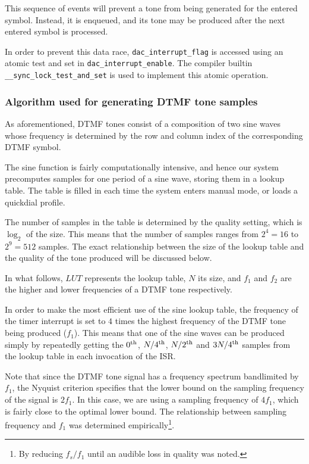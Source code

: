 \documentclass[11pt,a4paper,twocolumn]{scrartcl}
\begin{document}
This sequence of events will prevent a tone from being generated for the entered symbol. Instead, it is enqueued, and its tone may be produced after the next entered symbol is processed.

In order to prevent this data race, \verb!dac_interrupt_flag! is accessed using an atomic test and set in \verb!dac_interrupt_enable!. The compiler builtin \verb!__sync_lock_test_and_set! is used to implement this atomic operation.

\subsubsection{Algorithm used for generating DTMF tone samples}

As aforementioned, DTMF tones consist of a composition of two sine waves whose frequency is determined by the row and column index of the corresponding DTMF symbol.

The sine function is fairly computationally intensive, and hence our system precomputes samples for one period of a sine wave, storing them in a lookup table. The table is filled in each time the system enters manual mode, or loads a quickdial profile. 

The number of samples in the table is determined by the quality setting, which is $\log_2$ of the size. This means that the number of samples ranges from $2^4 = 16$ to $2^9 = 512$ samples. The exact relationship between the size of the lookup table and the quality of the tone produced will be discussed below.

In what follows, $LUT$ represents the lookup table, $N$ its size, and $f_1$ and $f_2$ are the higher and lower frequencies of a DTMF tone respectively.

In order to make the most efficient use of the sine lookup table, the frequency of the timer interrupt is set to $4$ times the highest frequency of the DTMF tone being produced ($f_1$). This means that one of the sine waves can be produced simply by repeatedly getting the $0\textsuperscript{th}$, $N/4\textsuperscript{th}$, $N/2\textsuperscript{th}$ and $3N/4\textsuperscript{th}$ samples from the lookup table in each invocation of the ISR. 

Note that since the DTMF tone signal has a frequency spectrum bandlimited by $f_1$, the Nyquist criterion specifies that the lower bound on the sampling frequency of the signal is $2f_1$. In this case, we are using a sampling frequency of $4f_1$, which is fairly close to the optimal lower bound. The relationship between sampling frequency and $f_1$ was determined empirically\footnote{By reducing $f_s/f_1$ until an audible loss in quality was noted.}.
\end{document}
